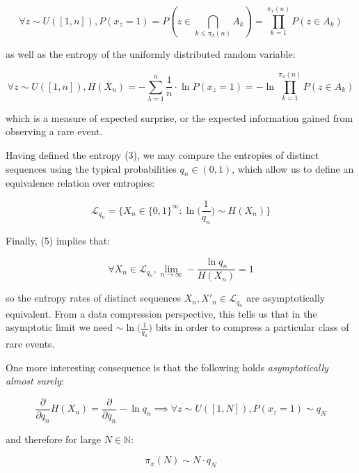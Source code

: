 \documentclass{article}
\begin{document}
\begin{equation}
\forall z \sim U([1,n]), P(x_z =1) = P(z \in \bigcap_{k \leq \pi_x(n)} A_k) = \prod_{k=1}^{\pi_x(n)} P(z \in A_k)
\end{equation}

as well as the entropy of the uniformly distributed random variable:

\begin{equation}
\forall z \sim U([1,n]), H(X_n) = -\sum_{\lambda =1}^n \frac{1}{n} \cdot \ln P(x_z =1) = -\ln \prod_{k=1}^{\pi_x(n)} P(z \in A_k)
\end{equation}

which is a measure of expected surprise, or the expected information gained from observing a rare event.

Having defined the entropy (3), we may compare the entropies of distinct sequences using the typical probabilities
$q_n \in (0,1)$, which allow us to define an equivalence relation over entropies:

\begin{equation}
\mathcal{L}_{q_n} = \{X_n \in \{0,1\}^{\infty}: \ln \big(\frac{1}{q_n}\big) \sim H(X_n) \}
\end{equation}

\newpage 

Finally, (5) implies that:

\begin{equation}
\forall X_n \in \mathcal{L}_{q_n}, \lim_{n \to \infty} -\frac{\ln q_n}{H(X_n)} = 1
\end{equation}

so the entropy rates of distinct sequences $X_n,X'_n \in \mathcal{L}_{q_n}$ are
asymptotically equivalent. From a data compression perspective, this tells us 
that in the asymptotic limit we need $\sim \ln \big(\frac{1}{q_n}\big)$ bits in order to compress a particular class of rare events. 

One more interesting consequence is that the following holds \textit{asymptotically almost surely}: 

\begin{equation}
\frac{\partial}{\partial q_n} H(X_n) = \frac{\partial}{\partial q_n} -\ln q_n \implies \forall z \sim U([1,N]), P(x_z = 1) \sim q_N
\end{equation} 

and therefore for large $N \in \mathbb{N}$:

\begin{equation}
\pi_x(N) \sim N \cdot q_N 	
\end{equation} 
\end{document}
